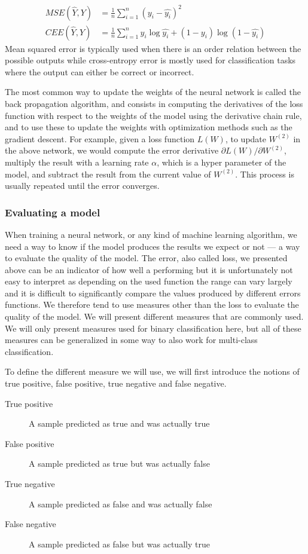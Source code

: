 \begin{align}
  \label{eq:mse}MSE(\hat{Y}, Y) &= \frac{1}{n}\sum_{i=1}^{n} \left( y_i - \hat{y_i} \right)^2\\
  \label{eq:cee}CEE(\hat{Y}, Y) &= \frac{1}{n}\sum_{i=1}^{n}
                                  y_i\log\hat{y_i} + (1 - y_i)\log(1 - \hat{y_i})
\end{align}
Mean squared error is typically used when there is an order relation between the
possible outputs while cross-entropy error is mostly used for classification
tasks where the output can either be correct or incorrect.

The most common way to update the weights of the neural network is called the
back propagation algorithm, and consists in computing the derivatives of the
loss function with respect to the weights of the model using the derivative
chain rule, and to use these to update the weights with optimization methods
such as the gradient descent. For example, given a loss function $L(W)$, to
update $W^{(2)}$ in the above network, we would compute the error derivative
$\partial L(W)/\partial W^{(2)}$, multiply the result with a learning
rate $\alpha$, which is a hyper parameter of the model, and subtract the result
from the current value of $W^{(2)}$. This process is usually repeated until the
error converges.
\subsubsection{Evaluating a model}
When training a neural network, or any kind of machine learning algorithm, we
need a way to know if the model produces the results we expect or not --- a way
to evaluate the quality of the model. The error, also called loss, we presented
above can be an indicator of how well a performing but it is unfortunately not
easy to interpret as depending on the used function the range can vary largely
and it is difficult to significantly compare the values produced by different
errors functions. We therefore tend to use measures other than the loss to
evaluate the quality of the model. We will present different measures that
are commonly used. We will only present measures used for binary classification
here, but all of these measures can be generalized in some way to also work for
multi-class classification.

To define the different measure we will use, we will first introduce the notions
of true positive, false positive, true negative and false negative.

\begin{description}
\item[True positive] A sample predicted as true and was actually true
\item[False positive] A sample predicted as true but was actually false
\item[True negative] A sample predicted as false and was actually false
\item[False negative] A sample predicted as false but was actually true
\end{description}

